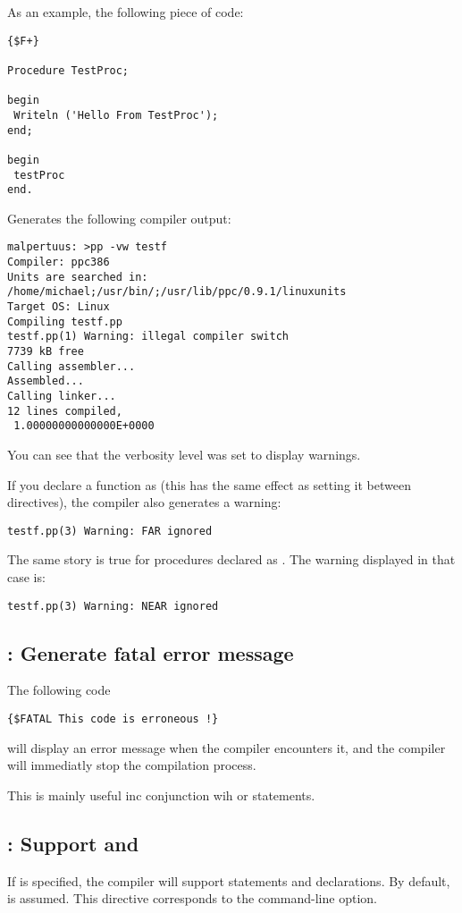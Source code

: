 As an example, the following piece of code:
\begin{verbatim}
{$F+}

Procedure TestProc;

begin
 Writeln ('Hello From TestProc');
end;

begin
 testProc
end.
\end{verbatim}
Generates the following compiler output:
\begin{verbatim}
malpertuus: >pp -vw testf
Compiler: ppc386
Units are searched in: /home/michael;/usr/bin/;/usr/lib/ppc/0.9.1/linuxunits
Target OS: Linux
Compiling testf.pp
testf.pp(1) Warning: illegal compiler switch
7739 kB free
Calling assembler...
Assembled...
Calling linker...
12 lines compiled,
 1.00000000000000E+0000
\end{verbatim}
You can see that the verbosity level was set to display warnings.

If you declare a function as  (this has the same effect as setting it
between  directives), the compiler also generates a
warning:
\begin{verbatim}
testf.pp(3) Warning: FAR ignored
\end{verbatim}

The same story is true for procedures declared as . The warning
displayed in that case is:
\begin{verbatim}
testf.pp(3) Warning: NEAR ignored
\end{verbatim}

\subsection{ : Generate fatal error message}

The following code
\begin{verbatim}
{$FATAL This code is erroneous !}
\end{verbatim}
will display an error message when the compiler encounters it,
and the compiler will immediatly stop the compilation process.

This is mainly useful inc conjunction wih  or
 statements.

\subsection{ : Support  and }

If  is specified, the compiler will support 
statements and  declarations. By default,  is
assumed. This directive corresponds to the  command-line option.

